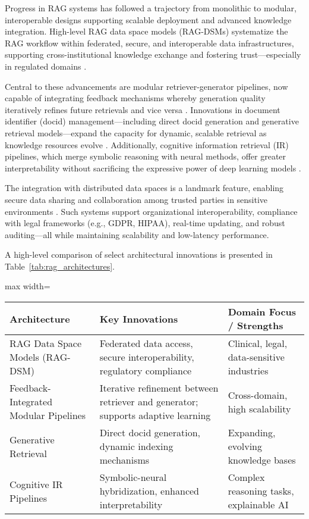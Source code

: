 Progress in RAG systems has followed a trajectory from monolithic to modular, interoperable designs supporting scalable deployment and advanced knowledge integration. High-level RAG data space models (RAG-DSMs) systematize the RAG workflow within federated, secure, and interoperable data infrastructures, supporting cross-institutional knowledge exchange and fostering trust—especially in regulated domains \cite{ref64}.

Central to these advancements are modular retriever-generator pipelines, now capable of integrating feedback mechanisms whereby generation quality iteratively refines future retrievals and vice versa \cite{ref4,ref5,ref14,ref15,ref22,ref28,ref33,ref36,ref37,ref38,ref47,ref54,ref63,ref64}. Innovations in document identifier (docid) management—including direct docid generation and generative retrieval models—expand the capacity for dynamic, scalable retrieval as knowledge resources evolve \cite{ref45,ref52,ref54}. Additionally, cognitive information retrieval (IR) pipelines, which merge symbolic reasoning with neural methods, offer greater interpretability without sacrificing the expressive power of deep learning models \cite{ref31,ref37,ref47}.

The integration with distributed data spaces is a landmark feature, enabling secure data sharing and collaboration among trusted parties in sensitive environments \cite{ref64}. Such systems support organizational interoperability, compliance with legal frameworks (e.g., GDPR, HIPAA), real-time updating, and robust auditing—all while maintaining scalability and low-latency performance.

A high-level comparison of select architectural innovations is presented in Table~\ref{tab:rag_architectures}.

\begin{table*}[htbp]
\centering
\caption{Notable RAG architectural innovations and their domain strengths.}
\label{tab:rag_architectures}
\begin{adjustbox}{max width=\textwidth}
\begin{tabular}{lll}
\toprule
\textbf{Architecture} & \textbf{Key Innovations} & \textbf{Domain Focus / Strengths} \\
\midrule
RAG Data Space Models (RAG-DSM) & Federated data access, secure interoperability, regulatory compliance & Clinical, legal, data-sensitive industries \\
Feedback-Integrated Modular Pipelines & Iterative refinement between retriever and generator; supports adaptive learning & Cross-domain, high scalability \\
Generative Retrieval & Direct docid generation, dynamic indexing mechanisms & Expanding, evolving knowledge bases \\
Cognitive IR Pipelines & Symbolic-neural hybridization, enhanced interpretability & Complex reasoning tasks, explainable AI \\
\bottomrule
\end{tabular}
\end{adjustbox}
\end{table*}

